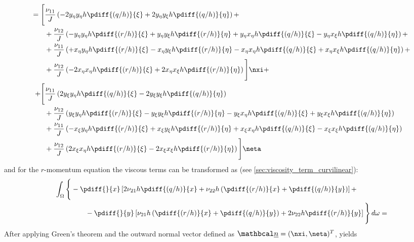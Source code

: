 \begin{align}
    = \Bigg[ &  \frac{\nu_{11}}{J} \left(
    - 2 y_{\eta} y_{\eta} h \pdiff{(q/h)}{\xi}
    + 2 y_{\eta} y_{\xi} h \pdiff{(q/h)}{\eta} \right)
    +
    \\* & +
    \frac{\nu_{12}}{J} \left(
    - y_{\eta}y_{\eta} h \pdiff{(r/h)}{\xi}
    + y_{\eta}y_{\xi} h \pdiff{(r/h)}{\eta}
    + y_{\eta}x_{\eta} h \pdiff{(q/h)}{\xi}
    - y_{\eta}x_{\xi} h \pdiff{(q/h)}{\eta} \right) +
    \\* & +
    \frac{\nu_{11}}{J} \left(
    + x_{\eta}y_{\eta} h \pdiff{(r/h)}{\xi}
    - x_{\eta}y_{\xi} h \pdiff{(r/h)}{\eta}
    - x_{\eta}x_{\eta} h \pdiff{(q/h)}{\xi}
    + x_{\eta}x_{\xi} h \pdiff{(q/h)}{\eta}
    \right) +
    \\* & +
    \frac{\nu_{12}}{J} \left(
    - 2 x_{\eta}x_{\eta} h \pdiff{(r/h)}{\xi}
    + 2 x_{\eta}x_{\xi} h \pdiff{(r/h)}{\eta}
    \right)
    \Bigg] \nxi +
    \\
    + \Bigg[ &
    \frac{\nu_{11}}{J} \left(
    2 y_{\xi}  y_{\eta} h \pdiff{(q/h)}{\xi}
    - 2 y_{\xi} y_{\xi} h \pdiff{(q/h)}{\eta}
    \right)
    \\* & +
    \frac{\nu_{12}}{J} \left(
    y_{\xi}y_{\eta} h \pdiff{(r/h)}{\xi}
    - y_{\xi}y_{\xi} h \pdiff{(r/h)}{\eta}
    - y_{\xi}x_{\eta} h \pdiff{(q/h)}{\xi}
    + y_{\xi}x_{\xi} h \pdiff{(q/h)}{\eta}
    \right)
    \\* & +
    \frac{\nu_{11}}{J} \left(
    - x_{\xi}y_{\eta} h \pdiff{(r/h)}{\xi}
    + x_{\xi}y_{\xi} h \pdiff{(r/h)}{\eta}
    + x_{\xi}x_{\eta} h \pdiff{(q/h)}{\xi}
    - x_{\xi}x_{\xi} h \pdiff{(q/h)}{\eta}
    \right)
    \\* & +
    \frac{\nu_{12}}{J} \left(
    2 x_{\xi}x_{\eta} h \pdiff{(r/h)}{\xi}
    - 2 x_{\xi}x_{\xi} h \pdiff{(r/h)}{\eta}
    \right)
    \Bigg] \neta \label{eq:xi_greens_viscous_term}
\end{align}
and for the $r$-momentum equation the viscous terms can be transformed as (see \autoref{sec:viscosity_term_curvilinear}):
\begin{align}
    \int_{\Omega} \Bigg\{
    &-\pdiff{}{x} \left[ 2 \nu_{21} h \pdiff{(q/h)}{x} + \nu_{22}  h \left(\pdiff{(r/h)}{x} + \pdiff{(q/h)}{y}\right) \right] +
    \\
    &\qquad
    - \pdiff{}{y} \left[ \nu_{21} h \left(\pdiff{(r/h)}{x} + \pdiff{(q/h)}{y}\right) + 2 \nu_{22} h \pdiff{(r/h)}{y} \right]
    \Bigg\} \, d\omega
    =
\end{align}
After applying Green's theorem and the outward normal vector defined as  $\vecn = (\nxi, \neta)^T$, yields
